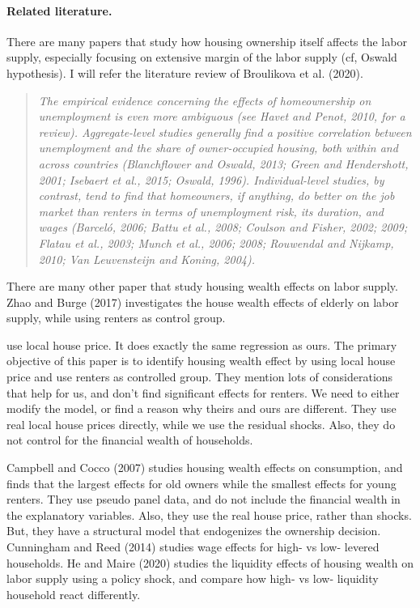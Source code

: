 \documentclass[10pt]{article}
\theoremstyle{definition}
\theoremstyle{remark}
\begin{document}
\paragraph{Related literature.} There are many papers that study how housing ownership itself affects the labor supply, especially focusing on extensive margin of the labor supply (cf, Oswald hypothesis). I will refer the literature review of Broulikova et al. (2020).

\begin{quote}
    \textit{The empirical evidence concerning the effects of homeownership on unemployment is even more ambiguous (see Havet and Penot, 2010, for a review). Aggregate-level studies generally find a positive correlation between unemployment and the share of owner-occupied housing, both within and across countries (Blanchflower and Oswald, 2013; Green and Hendershott, 2001; Isebaert et al., 2015; Oswald, 1996). Individual-level studies, by contrast, tend to find that homeowners, if anything, do better on the job market than renters in terms of unemployment risk, its duration, and wages (Barceló, 2006; Battu et al., 2008; Coulson and Fisher, 2002; 2009; Flatau et al., 2003; Munch et al., 2006; 2008; Rouwendal and Nijkamp, 2010; Van Leuvensteijn and Koning, 2004).}
\end{quote}

There are many other paper that study housing wealth effects on labor supply. Zhao and Burge (2017) investigates the house wealth effects of elderly on labor supply, while using renters as control group.

\cite{DG2018} use local house price. It does exactly the same regression as ours. The primary objective of this paper is to identify housing wealth effect by using local house price and use renters as controlled group. They mention lots of considerations that help for us, and don't find significant effects for renters. We need to either modify the model, or find a reason why theirs and ours are different. They use real local house prices directly, while we use the residual shocks. Also, they do not control for the financial wealth of households. 

Campbell and Cocco (2007) studies housing wealth effects on consumption, and finds that the largest effects for old owners while the smallest effects for young renters. They use pseudo panel data, and do not include the financial wealth in the explanatory variables. Also, they use the real house price, rather than shocks. But, they have a structural model that endogenizes the ownership decision. Cunningham and Reed (2014) studies wage effects for high- vs low- levered households. He and Maire (2020) studies the liquidity effects of housing wealth on labor supply using a policy shock, and compare how high- vs low- liquidity household react differently.
\end{document}
